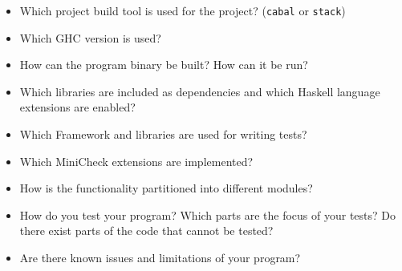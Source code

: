 \documentclass{article}
\begin{document}
\begin{itemize}
\item Which project build tool is used for the project? (\texttt{cabal} or \texttt{stack})
\item Which GHC version is used?
\item How can the program binary be built? How can it be run?
\item Which libraries are included as dependencies and which Haskell language extensions are enabled?
\item Which Framework and libraries are used for writing tests?
\item Which MiniCheck extensions are implemented?
\item How is the functionality partitioned into different modules?
\item How do you test your program? Which parts are the focus of your tests? Do there exist parts of the code that cannot be tested?
\item Are there known issues and limitations of your program?
\end{itemize}

\vspace*{1cm}
\end{document}
